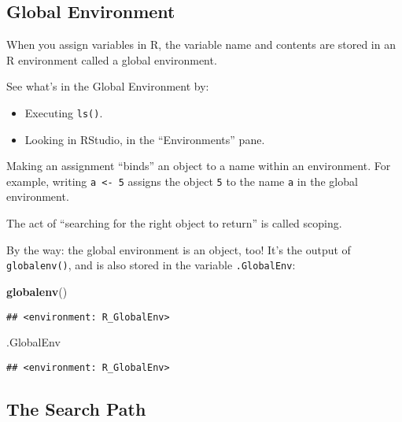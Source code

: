 \documentclass[]{article}
\newenvironment{Shaded}{\begin{snugshade}}{\end{snugshade}}
\newcommand{\KeywordTok}[1]{\textcolor[rgb]{0.13,0.29,0.53}{\textbf{#1}}}
\newcommand{\NormalTok}[1]{#1}
\providecommand{\tightlist}{%
  \setlength{\itemsep}{0pt}\setlength{\parskip}{0pt}}
\begin{document}
\subsection{Global Environment}\label{global-environment}

When you assign variables in R, the variable name and contents are
stored in an R environment called a global environment.

See what's in the Global Environment by:

\begin{itemize}
\tightlist
\item
  Executing \texttt{ls()}.
\item
  Looking in RStudio, in the ``Environments'' pane.
\end{itemize}

Making an assignment ``binds'' an object to a name within an
environment. For example, writing \texttt{a\ \textless{}-\ 5} assigns
the object \texttt{5} to the name \texttt{a} in the global environment.

The act of ``searching for the right object to return'' is called
scoping.

By the way: the global environment is an object, too! It's the output of
\texttt{globalenv()}, and is also stored in the variable
\texttt{.GlobalEnv}:

\begin{Shaded}
\begin{Highlighting}[]
\KeywordTok{globalenv}\NormalTok{()}
\end{Highlighting}
\end{Shaded}

\begin{verbatim}
## <environment: R_GlobalEnv>
\end{verbatim}

\begin{Shaded}
\begin{Highlighting}[]
\NormalTok{.GlobalEnv}
\end{Highlighting}
\end{Shaded}

\begin{verbatim}
## <environment: R_GlobalEnv>
\end{verbatim}

\subsection{The Search Path}\label{the-search-path}
\end{document}

